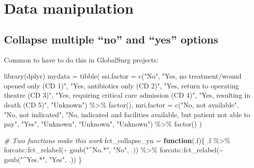 \documentclass[
]{book}
\newenvironment{Shaded}{\begin{snugshade}}{\end{snugshade}}
\newcommand{\AttributeTok}[1]{\textcolor[rgb]{0.77,0.63,0.00}{#1}}
\newcommand{\CommentTok}[1]{\textcolor[rgb]{0.56,0.35,0.01}{\textit{#1}}}
\newcommand{\ControlFlowTok}[1]{\textcolor[rgb]{0.13,0.29,0.53}{\textbf{#1}}}
\newcommand{\FunctionTok}[1]{\textcolor[rgb]{0.00,0.00,0.00}{#1}}
\newcommand{\NormalTok}[1]{#1}
\newcommand{\OtherTok}[1]{\textcolor[rgb]{0.56,0.35,0.01}{#1}}
\newcommand{\SpecialCharTok}[1]{\textcolor[rgb]{0.00,0.00,0.00}{#1}}
\newcommand{\StringTok}[1]{\textcolor[rgb]{0.31,0.60,0.02}{#1}}
\begin{document}
\hypertarget{data-manipulation}{%
\chapter{Data manipulation}\label{data-manipulation}}

\hypertarget{collapse-multiple-no-and-yes-options}{%
\section{Collapse multiple ``no'' and ``yes'' options}\label{collapse-multiple-no-and-yes-options}}

Common to have to do this in GlobalSurg projects:

\begin{Shaded}
\begin{Highlighting}[]
\FunctionTok{library}\NormalTok{(dplyr)}
\NormalTok{mydata }\OtherTok{=} \FunctionTok{tibble}\NormalTok{(}
  \AttributeTok{ssi.factor =} \FunctionTok{c}\NormalTok{(}\StringTok{"No"}\NormalTok{, }\StringTok{"Yes, no treatment/wound opened only (CD 1)"}\NormalTok{,    }
                 \StringTok{"Yes, antibiotics only (CD 2)"}\NormalTok{, }\StringTok{"Yes, return to operating theatre (CD 3)"}\NormalTok{, }
                 \StringTok{"Yes, requiring critical care admission (CD 4)"}\NormalTok{, }
                 \StringTok{"Yes, resulting in death (CD 5)"}\NormalTok{,}
                 \StringTok{"Unknown"}\NormalTok{) }\SpecialCharTok{\%\textgreater{}\%}
    \FunctionTok{factor}\NormalTok{(),}
  \AttributeTok{mri.factor =} \FunctionTok{c}\NormalTok{(}\StringTok{"No, not available"}\NormalTok{, }\StringTok{"No, not indicated"}\NormalTok{, }
                 \StringTok{"No, indicated and facilities available, but patient not able to pay"}\NormalTok{,}
                 \StringTok{"Yes"}\NormalTok{, }\StringTok{"Unknown"}\NormalTok{, }\StringTok{"Unknown"}\NormalTok{, }\StringTok{"Unknown"}\NormalTok{) }\SpecialCharTok{\%\textgreater{}\%} 
    \FunctionTok{factor}\NormalTok{()}
\NormalTok{)}

\CommentTok{\# Two functions make this work}
\NormalTok{fct\_collapse\_yn }\OtherTok{=} \ControlFlowTok{function}\NormalTok{(.f)\{}
\NormalTok{  .f }\SpecialCharTok{\%\textgreater{}\%} 
\NormalTok{    forcats}\SpecialCharTok{::}\FunctionTok{fct\_relabel}\NormalTok{(}\SpecialCharTok{\textasciitilde{}} \FunctionTok{gsub}\NormalTok{(}\StringTok{"\^{}No.*"}\NormalTok{, }\StringTok{"No"}\NormalTok{, .)) }\SpecialCharTok{\%\textgreater{}\%} 
\NormalTok{    forcats}\SpecialCharTok{::}\FunctionTok{fct\_relabel}\NormalTok{(}\SpecialCharTok{\textasciitilde{}} \FunctionTok{gsub}\NormalTok{(}\StringTok{"\^{}Yes.*"}\NormalTok{, }\StringTok{"Yes"}\NormalTok{, .))}
\NormalTok{\}}


\end{Highlighting}
\end{Shaded}
\end{document}
